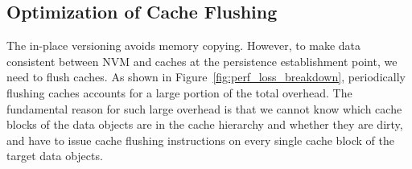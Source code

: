 \subsection{Optimization of Cache Flushing}
\label{sec:perf_opt}
The in-place versioning avoids memory copying. However, to make data consistent between NVM and caches at the persistence establishment point, we need to flush caches.
As shown in Figure~\ref{fig:perf_loss_breakdown}, periodically flushing caches accounts for a large portion of the total overhead. 
The fundamental reason for such large overhead is that we cannot know which cache blocks of the data objects are in the cache hierarchy and whether they are dirty, and have to issue cache flushing instructions on every single cache block of the target data objects. 

\begin{comment}
However, our performance study reveals that if a cache block is not in the cache or the cache line is clean, flushing the cache line is very costly. 
Figure~\ref{fig:perf_cache_flush} depicts performance of flushing cache lines using 
{\fontfamily{qcr}\selectfont clflush} instruction. 
\end{comment}

\begin{comment}
\begin{figure}
\centering
\texttt{[image: figures/prelim\_design2.pdf]}
\caption*{Figure x: Performance study for flushing cache lines.}
\label{fig:perf_cache_flush}
\end{figure}
\end{comment}

\begin{comment}
\begin{table}
\centering
\caption*{Table x: Performance of flushing cache blocks in different states in caches.}
\footnotesize 
\begin{tabular}{| p{1.7cm} | p{1.7cm} | p{1.7cm} | p{1.8cm} |}
       \hline
       & \textbf{Flush a dirty cache line} & \textbf{Flush a clean cache line} & \textbf{Flush an non-existent cache line} \\ \hline \hline
     Performance () & 5.16E+06 & 4.54E+06 & 3.50E+06 \\
       \hline
\end{tabular}
\label{tab:diff_clflush_perf}
\end{table}
\end{comment}

